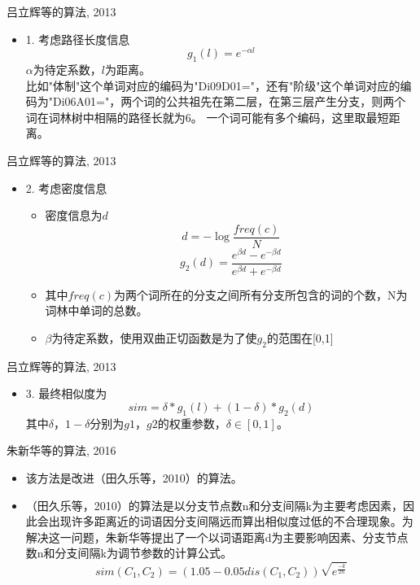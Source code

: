 \documentclass{beamer}
\begin{document}
    \begin{frame}{吕立辉等的算法, 2013}
    \begin{itemize}
      \item 1. 考虑路径长度信息 \\
      $$
        g_1(l) = e^{-{\alpha}l}
      $$
      $\alpha$为待定系数，$l$为距离。 \\
      比如"体制"这个单词对应的编码为"Di09D01="，还有"阶级"这个单词对应的编码为"Di06A01="，两个词的公共祖先在第二层，在第三层产生分支，则两个词在词林树中相隔的路径长就为6。 
      一个词可能有多个编码，这里取最短距离。
    \end{itemize}
    \end{frame}

    \begin{frame}{吕立辉等的算法, 2013}
    \begin{itemize}
      \item 2. 考虑密度信息 \\
      \begin{itemize}
        \item 密度信息为$d$
        $$
          d = -\log{\frac{freq(c)}{N}}
        $$
        $$
          g_2(d) = \frac{e^{\beta d} - e^{-\beta d}}{e^{\beta d} + e^{-\beta d}}
        $$
        \item 其中$freq(c)$为两个词所在的分支之间所有分支所包含的词的个数，N为词林中单词的总数。
        \item $\beta$为待定系数，使用双曲正切函数是为了使$g_2$的范围在[0,1]
      \end{itemize}
    \end{itemize}
    \end{frame}

    \begin{frame}{吕立辉等的算法, 2013}
      \begin{itemize}
        \item 3. 最终相似度为
        $$
          sim = \delta * g_1(l) + (1 - \delta) * g_2(d)
        $$
        其中$\delta$，$1-\delta$分别为$g1$，$g2$的权重参数，$\delta \in [0, 1]$。
      \end{itemize}
    \end{frame}

    \begin{frame}{朱新华等的算法, 2016}
      \begin{itemize}
        \item 该方法是改进（田久乐等，2010）的算法。
        \item （田久乐等，2010）的算法是以分支节点数n和分支间隔k为主要考虑因素，因此会出现许多距离近的词语因分支间隔远而算出相似度过低的不合理现象。为解决这一问题，朱新华等提出了一个以词语距离d为主要影响因素、分支节点数n和分支间隔k为调节参数的计算公式。
        $$
          sim(C_1, C_2) = (1.05 - 0.05dis(C_1, C_2)) \sqrt{e^{\frac{-k}{2n}}}
        $$
      \end{itemize}
    \end{frame}
\end{document}
